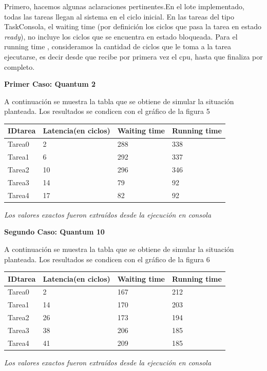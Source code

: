 \documentclass[10pt, a4paper]{article}
\begin{document}
Primero, hacemos algunas aclaraciones pertinentes.En el  lote implementado, todas las tareas llegan al sistema en el ciclo inicial.
En las tareas del tipo TaskConsola, el waiting time (por definición los ciclos que pasa la tarea en estado \textit{ready}), no incluye los ciclos que se encuentra en estado bloqueada.
Para el running time , consideramos la cantidad de ciclos que le toma a la tarea ejecutarse, es decir desde que recibe por primera vez el cpu, hasta que finaliza por completo.

\begin{flushleft}
\textbf{Primer Caso: Quantum 2}\\
\end{flushleft}


A continuación se muestra la tabla que se obtiene de simular la situación planteada. Los resultados se condicen con el gráfico de la figura 5	
\begin{center}
\begin{tabular}{| l | l | l | l |}
    \hline
    IDtarea & Latencia(en ciclos)& Waiting time & Running time\\ \hline
    Tarea0 & 	2 	&	288	&  	338 \\ \hline
    Tarea1 &	6	&	292	& 	337 \\ \hline
    Tarea2 &	10	&	296	&	346 \\ \hline
    Tarea3 &	14	&	79	& 	92 \\ \hline
    Tarea4 &	17	&	82	&	92 \\ \hline

\end{tabular}
\end{center}
\begin{center}
  \textit{Los valores exactos fueron extraídos desde la ejecución en consola}
\end{center}


\begin{flushleft}
\textbf{Segundo Caso: Quantum 10}\\
\end{flushleft}


A continuación se muestra la tabla que se obtiene de simular la situación planteada. Los resultados se condicen con el gráfico de la figura 6	
\begin{center}
\begin{tabular}{| l | l | l | l |}
    \hline
    IDtarea & Latencia(en ciclos)& Waiting time & Running time\\ \hline
    Tarea0 & 	2 	&	167	&  	212 \\ \hline
    Tarea1 &	14	&	170	& 	203 \\ \hline
    Tarea2 &	26	&	173	&	194 \\ \hline
    Tarea3 &	38	&	206	& 	185 \\ \hline
    Tarea4 &	41	&	209	&	185 \\ \hline

\end{tabular}
\end{center}
\begin{center}
  \textit{Los valores exactos fueron extraídos desde la ejecución en consola}
\end{center}
\end{document}
